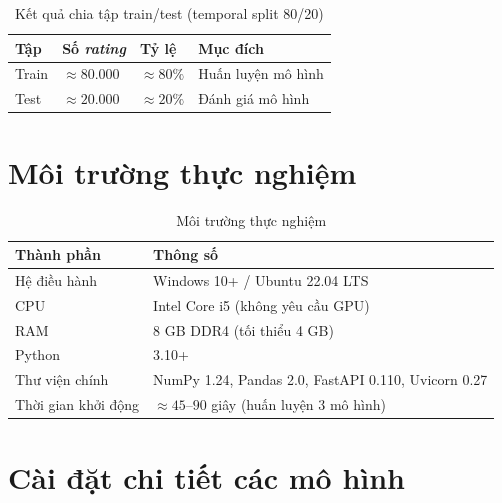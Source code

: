 \documentclass[../BTL.tex]{subfiles}
\begin{document}
\begin{table}[H]
    \centering
    \caption{Kết quả chia tập train/test (temporal split 80/20)}
    \label{tab:split}
    \begin{tabular}{llll}
        \toprule
        \textbf{Tập} & \textbf{Số \textit{rating}} & \textbf{Tỷ lệ}
                     & \textbf{Mục đích} \\
        \midrule
        Train & ${\approx}80.000$ & ${\approx}80\%$
              & Huấn luyện mô hình \\
        Test  & ${\approx}20.000$ & ${\approx}20\%$
              & Đánh giá mô hình \\
        \bottomrule
    \end{tabular}
\end{table}


\section{Môi trường thực nghiệm}
\label{section:3.5}

\begin{table}[H]
    \centering
    \caption{Môi trường thực nghiệm}
    \label{tab:env}
    \begin{tabular}{ll}
        \toprule
        \textbf{Thành phần}    & \textbf{Thông số} \\
        \midrule
        Hệ điều hành  & Windows 10+ / Ubuntu 22.04 LTS \\
        CPU           & Intel Core i5 (không yêu cầu GPU) \\
        RAM           & 8 GB DDR4 (tối thiểu 4 GB) \\
        Python        & 3.10+ \\
        Thư viện chính
            & NumPy 1.24, Pandas 2.0, FastAPI 0.110, Uvicorn 0.27 \\
        Thời gian khởi động
            & ${\approx}45$–$90$ giây (huấn luyện 3 mô hình) \\
        \bottomrule
    \end{tabular}
\end{table}

\section{Cài đặt chi tiết các mô hình}
\label{section:3.6}
\end{document}
